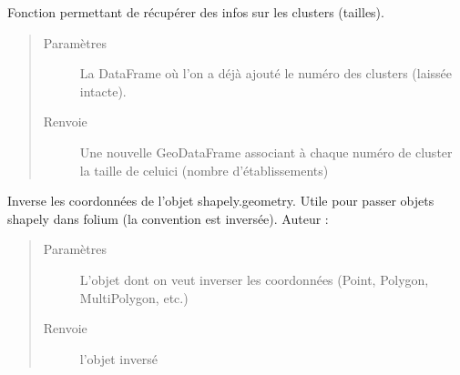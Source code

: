 \documentclass[letterpaper,10pt,french]{sphinxmanual}
\begin{document}
\begin{fulllineitems}
\label{\detokenize{index:src.clusterizer.utils.clusterizer_utils.get_infos_clusters_taille}}
\sphinxAtStartPar
Fonction permettant de récupérer des infos sur les clusters (tailles).
\begin{quote}\begin{description}
\item[{Paramètres}] \leavevmode
\sphinxAtStartPar
{} \textendash{} La DataFrame où l’on a déjà ajouté le numéro des clusters (laissée intacte).

\item[{Renvoie}] \leavevmode
\sphinxAtStartPar
Une nouvelle GeoDataFrame associant à chaque numéro de cluster la taille de celui\sphinxhyphen{}ci
(nombre d’établissements)

\end{description}\end{quote}

\end{fulllineitems}


\begin{fulllineitems}
\label{\detokenize{index:src.clusterizer.utils.clusterizer_utils.swap_xy}}
\sphinxAtStartPar
Inverse les coordonnées de l’objet shapely.geometry.
Utile pour passer objets shapely dans folium (la convention est inversée).
Auteur : 
\begin{quote}\begin{description}
\item[{Paramètres}] \leavevmode
\sphinxAtStartPar
{} \textendash{} L’objet dont on veut inverser les coordonnées (Point, Polygon, MultiPolygon, etc.)

\item[{Renvoie}] \leavevmode
\sphinxAtStartPar
l’objet inversé

\end{description}\end{quote}

\end{fulllineitems}
\end{document}

